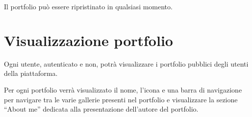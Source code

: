 Il portfolio pu\`o essere ripristinato in qualsiasi momento.


\section{Visualizzazione portfolio}
Ogni utente, autenticato e non, potr\`a visualizzare i portfolio pubblici degli utenti della piattaforma.

Per ogni portfolio verr\`a visualizzato il nome, l'icona e una barra di navigazione per navigare tra le varie gallerie presenti nel portfolio e visualizzare la sezione ``About me'' dedicata alla presentazione dell'autore del portfolio.







